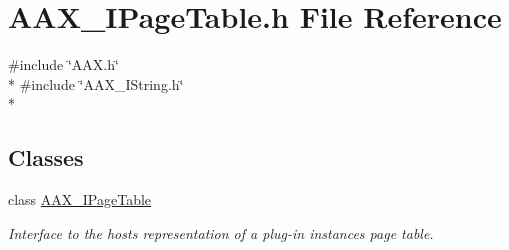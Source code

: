 \hypertarget{a00256}{}\section{A\+A\+X\+\_\+\+I\+Page\+Table.\+h File Reference}
\label{a00256}
{\ttfamily \#include \char`\"{}A\+A\+X.\+h\char`\"{}}\\*
{\ttfamily \#include \char`\"{}A\+A\+X\+\_\+\+I\+String.\+h\char`\"{}}\\*
\subsection*{Classes}
\begin{DoxyCompactItemize}
\item 
class \hyperlink{a00107}{A\+A\+X\+\_\+\+I\+Page\+Table}
\begin{DoxyCompactList}\small\item\em Interface to the host\textquotesingle{}s representation of a plug-\/in instance\textquotesingle{}s page table. \end{DoxyCompactList}\end{DoxyCompactItemize}
